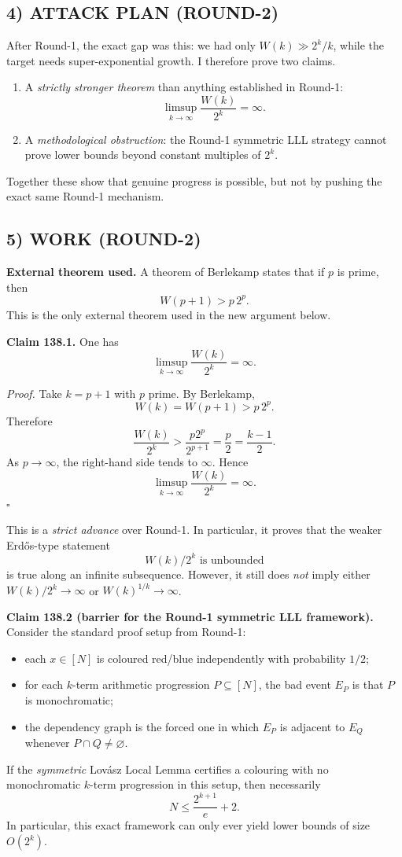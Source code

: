 \subsection*{4) ATTACK PLAN (ROUND-2)}
After Round-1, the exact gap was this: we had only $W(k)\gg 2^k/k$, while the target needs super-exponential growth.  I therefore prove two claims.
\begin{enumerate}
\item A \emph{strictly stronger theorem} than anything established in Round-1:
\[
\limsup_{k\to\infty} \frac{W(k)}{2^k}=\infty.
\]
\item A \emph{methodological obstruction}: the Round-1 symmetric LLL strategy cannot prove lower bounds beyond constant multiples of $2^k$.
\end{enumerate}
Together these show that genuine progress is possible, but not by pushing the exact same Round-1 mechanism.

\subsection*{5) WORK (ROUND-2)}

\medskip
\noindent\textbf{External theorem used.}  A theorem of Berlekamp states that if $p$ is prime, then
\[
W(p+1) > p\,2^p.
\]
This is the only external theorem used in the new argument below.

\medskip
\noindent\textbf{Claim 138.1.}  One has
\[
\limsup_{k\to\infty} \frac{W(k)}{2^k}=\infty.
\]

\smallskip
\noindent\emph{Proof.}
Take $k=p+1$ with $p$ prime.  By Berlekamp,
\[
W(k)=W(p+1) > p\,2^p.
\]
Therefore
\[
\frac{W(k)}{2^k} > \frac{p2^p}{2^{p+1}}=\frac{p}{2}=\frac{k-1}{2}.
\]
As $p\to\infty$, the right-hand side tends to $\infty$.  Hence
\[
\limsup_{k\to\infty}\frac{W(k)}{2^k}=\infty.
\]
\hfill$\square$

\medskip
\noindent This is a \emph{strict advance} over Round-1.  In particular, it proves that the weaker Erd\H{o}s-type statement
\[
W(k)/2^k \text{ is unbounded}
\]
is true along an infinite subsequence.  However, it still does \emph{not} imply either $W(k)/2^k\to\infty$ or $W(k)^{1/k}\to\infty$.

\medskip
\noindent\textbf{Claim 138.2 (barrier for the Round-1 symmetric LLL framework).}  Consider the standard proof setup from Round-1:
\begin{itemize}
\item each $x\in [N]$ is coloured red/blue independently with probability $1/2$;
\item for each $k$-term arithmetic progression $P\subseteq [N]$, the bad event $E_P$ is that $P$ is monochromatic;
\item the dependency graph is the forced one in which $E_P$ is adjacent to $E_Q$ whenever $P\cap Q\neq\varnothing$.
\end{itemize}
If the \emph{symmetric} Lov\'asz Local Lemma certifies a colouring with no monochromatic $k$-term progression in this setup, then necessarily
\[
N \le \frac{2^{k+1}}{e}+2.
\]
In particular, this exact framework can only ever yield lower bounds of size $O(2^k)$.


